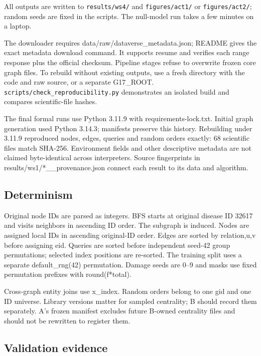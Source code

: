All outputs are written to \texttt{results/ws4/} and \texttt{figures/act1/} or
\texttt{figures/act2/}; random seeds are fixed in the scripts. The null-model
run takes a few minutes on a laptop.

The downloader requires data/raw/dataverse\_metadata.json; README gives
the exact metadata download command. It supports resume and verifies
each range response plus the official checksum. Pipeline stages refuse
to overwrite frozen core graph files. To rebuild without existing
outputs, use a fresh directory with the code and raw source, or a
separate G17\_ROOT. \texttt{scripts/check\_reproducibility.py}
demonstrates an isolated build and compares scientific-file hashes.

The final formal runs use Python 3.11.9 with requirements-lock.txt.
Initial graph generation used Python 3.14.3; manifests preserve this
history. Rebuilding under 3.11.9 reproduced nodes, edges, queries and
random orders exactly: 68 scientific files match SHA-256. Environment
fields and other descriptive metadata are not claimed byte-identical
across interpreters. Source fingerprints in
results/ws1/*\_\_provenance.json connect each result to its data and
algorithm.

\subsection{Determinism}\label{determinism}

Original node IDs are parsed as integers. BFS starts at original disease
ID 32617 and visits neighbors in ascending ID order. The subgraph is
induced. Nodes are assigned local IDs in ascending original-ID order.
Edges are sorted by relation,u,v before assigning eid. Queries are
sorted before independent seed-42 group permutations; selected index
positions are re-sorted. The training split uses a separate
default\_rng(42) permutation. Damage seeds are 0--9 and masks use fixed
permutation prefixes with round(f*total).

Cross-graph entity joins use x\_index. Random orders belong to one gid
and one ID universe. Library versions matter for sampled centrality; B
should record them separately. A's frozen manifest excludes future
B-owned centrality files and should not be rewritten to register them.

\subsection{Validation evidence}\label{validation-evidence}

